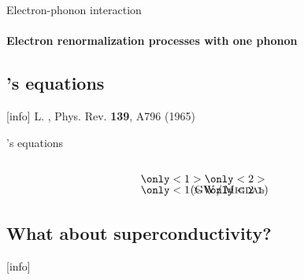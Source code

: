 \documentclass[10pt]{beamer}
\begin{document}
    \begin{frame}[label=interaction]{Electron-phonon interaction}
        \framesubtitle{Electron renormalization processes with one phonon}
        \begin{figure}
            \small
            
            
            
            
        \end{figure}
    \end{frame}

    \subsection{'s equations}

    [info]{%
        L. , Phys. Rev. \textbf{139}, A796 (1965)}

    \begin{frame}[label=Hedin]{'s equations}
        \begin{gather*}
             \\
            \only<1>{}%
            \only<2>{} \\
             \hspace{14mm}
             \\[-7mm]
            \only<1>{}%
            \only<2>{%
            \mathllap{\text{(GW\,/\,\name{Migdal})}}}
        \end{gather*}
    \end{frame}

    \subsection[Superconductivity?]{What about superconductivity?}

    [info]{}
\end{document}
